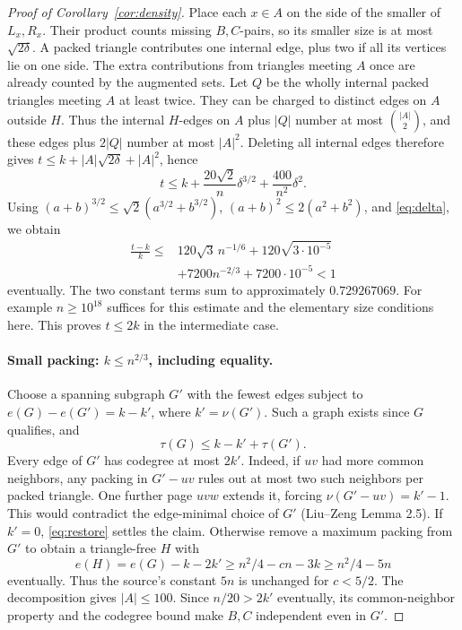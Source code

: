 \documentclass[11pt]{article}
\begin{document}
\begin{proof}[Proof of Corollary~\ref{cor:density}]
Place each $x\in A$ on the side of the smaller of $L_x,R_x$.
Their product counts missing $B,C$-pairs, so its smaller size is at
most $\sqrt{2\delta}$. A packed triangle contributes one internal
edge, plus two if all its vertices lie on one side. The extra
contributions from triangles meeting $A$ once are already counted
by the augmented sets. Let $Q$ be the wholly internal packed triangles
meeting $A$ at least twice. They can be charged to distinct edges on
$A$ outside $H$. Thus the internal $H$-edges on $A$ plus $|Q|$ number
at most $\binom{|A|}{2}$, and these edges plus $2|Q|$ number at most
$|A|^2$. Deleting all internal edges therefore gives
$t\le k+|A|\sqrt{2\delta}+|A|^2$, hence
\begin{equation}\label{eq:middle}
t\le k+\frac{20\sqrt2}{n}\delta^{3/2}+\frac{400}{n^2}\delta^2.
\end{equation}
Using $(a+b)^{3/2}\le\sqrt2(a^{3/2}+b^{3/2})$,
$(a+b)^2\le2(a^2+b^2)$, and \eqref{eq:delta}, we obtain
\begin{equation}\label{eq:margin}
\begin{aligned}
\frac{t-k}{k}\le{}&120\sqrt3\,n^{-1/6}
 +120\sqrt{3\cdot10^{-5}}\\
 &+7200n^{-2/3}+7200\cdot10^{-5}<1
\end{aligned}
\end{equation}
eventually. The two constant terms sum to approximately $0.729267069$.
For example $n\ge10^{18}$ suffices for this estimate and the elementary
size conditions here. This proves $t\le2k$ in the intermediate case.

\paragraph{Small packing: $k\le n^{2/3}$, including equality.}
Choose a spanning subgraph $G'$ with the fewest edges subject to
$e(G)-e(G')=k-k'$, where $k'=\nu(G')$. Such a graph exists since $G$
qualifies, and
\begin{equation}\label{eq:restore}
\tau(G)\le k-k'+\tau(G').
\end{equation}
Every edge of $G'$ has codegree at most $2k'$. Indeed, if $uv$ had more
common neighbors, any packing in $G'-uv$ rules out at most two such
neighbors per packed triangle. One further page $uvw$ extends it,
forcing $\nu(G'-uv)=k'-1$. This would contradict the edge-minimal
choice of $G'$ (Liu--Zeng Lemma 2.5).
If $k'=0$, \eqref{eq:restore} settles the claim. Otherwise remove a
maximum packing from $G'$ to obtain a triangle-free $H$ with
\begin{equation}\label{eq:small-deficit}
e(H)=e(G)-k-2k'\ge n^2/4-cn-3k\ge n^2/4-5n
\end{equation}
eventually. Thus the source's constant $5n$ is unchanged for $c<5/2$.
The decomposition gives $|A|\le100$. Since $n/20>2k'$ eventually,
its common-neighbor property and the codegree bound make $B,C$
independent even in $G'$.


\end{proof}
\end{document}
